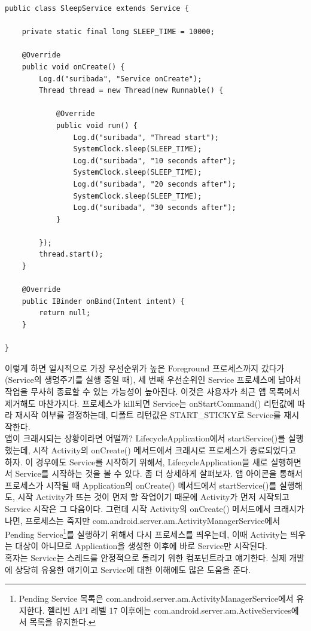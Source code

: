 \begin{lstlisting}[frame=single, caption=SleepService, label=SleepService]
public class SleepService extends Service {

	private static final long SLEEP_TIME = 10000;
	
	@Override
	public void onCreate() {
		Log.d("suribada", "Service onCreate");
		Thread thread = new Thread(new Runnable() {

			@Override
			public void run() {
				Log.d("suribada", "Thread start");
				SystemClock.sleep(SLEEP_TIME);
				Log.d("suribada", "10 seconds after");
				SystemClock.sleep(SLEEP_TIME);
				Log.d("suribada", "20 seconds after");
				SystemClock.sleep(SLEEP_TIME);
				Log.d("suribada", "30 seconds after");
			}
			
		});
		thread.start();
	}
	
	@Override
	public IBinder onBind(Intent intent) {
		return null;
	}

}
\end{lstlisting}
이렇게 하면 일시적으로 가장 우선순위가 높은 Foreground 프로세스까지 갔다가(Service의 생명주기를 실행 중일 때), 세 번째 우선순위인 Service 프로세스에 남아서 작업을 무사히 종료할 수 있는 가능성이 높아진다.
이것은 사용자가 최근 앱 목록에서 제거해도 마찬가지다. 
프로세스가 kill되면 Service는 onStartCommand() 리턴값에 따라 재시작 여부를 결정하는데, 디폴트 리턴값은 START\_STICKY로 Service를 재시작한다.\\

앱이 크래시되는 상황이라면 어떨까? LifecycleApplication에서 startService()를 실행했는데, 시작 Activity의 onCreate() 메서드에서 크래시로 프로세스가 종료되었다고 하자. 
이 경우에도 Service를 시작하기 위해서, LifecycleApplication을 새로 실행하면서 Service를 시작하는 것을 볼 수 있다.
좀 더 상세하게 살펴보자. 앱 아이콘을 통해서 프로세스가 시작될 때 Application의 onCreate() 메서드에서 startService()를 실행해도, 시작 Activity가 뜨는 것이 먼저 할 작업이기 때문에 Activity가 먼저 시작되고 Service 시작은 그 다음이다.
그런데 시작 Activity의 onCreate() 메서드에서 크래시가 나면, 프로세스는 죽지만 com.android.server.am.ActivityManagerService에서 Pending Service\footnote{Pending Service 목록은 com.android.server.am.ActivityManagerService에서 유지한다. 젤리빈 API 레벨 17 이후에는 com.android.server.am.ActiveServices에서 목록을 유지한다.}를 실행하기 위해서 다시 프로세스를 띄우는데, 이때 Activity는 띄우는 대상이 아니므로 Application을 생성한 이후에 바로 Service만 시작된다.\\

혹자는 Service는 스레드를 안정적으로 돌리기 위한 컴포넌트라고 얘기한다. 
실제 개발에 상당히 유용한 얘기이고 Service에 대한 이해에도 많은 도움을 준다.\\

